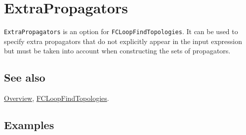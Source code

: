 \documentclass[../FeynCalcManual.tex]{subfiles}
\begin{document}
\hypertarget{extrapropagators}{%
\section{ExtraPropagators}\label{extrapropagators}}

\texttt{ExtraPropagators} is an option for
\texttt{FCLoopFindTopologies}. It can be used to specify extra
propagators that do not explicitly appear in the input expression but
must be taken into account when constructing the sets of propagators.

\subsection{See also}

\hyperlink{toc}{Overview},
\hyperlink{fcloopfindtopologies}{FCLoopFindTopologies}.

\subsection{Examples}
\end{document}
